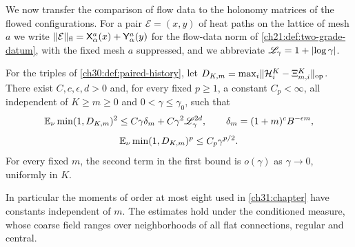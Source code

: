 We now transfer the comparison of flow data to the holonomy matrices of the flowed configurations. For a pair $\mathcal E=(x,y)$ of heat paths on the lattice of mesh $a$ we write $\lVert \mathcal E\rVert_{\mathrm{fl}}=\mathsf X_\alpha^a(x)+\mathsf Y_\alpha^a(y)$ for the flow-data norm of \cref{ch21:def:two-grade-datum}, with the fixed mesh $a$ suppressed, and we abbreviate $\mathscr L_\gamma=1+\lvert \log\gamma\rvert$.

\begin{theorem}\label{ch30:thm:scaled-matrix-tail}
For the triples of \cref{ch30:def:paired-history}, let $D_{K,m}=\max_i\lVert \mathcal H_i^K-\Xi_{m,i}^K\rVert_{\mathrm{op}}$. There exist $C,c,\epsilon,d>0$ and, for every fixed $p\ge1$, a constant $C_p<\infty$, all independent of $K\ge m\ge0$ and $0<\gamma\le\gamma_0$, such that
\[
 \mathbb E_\nu\min(1,D_{K,m})^2\le C\gamma\delta_m+C\gamma^2\mathscr L_\gamma^{2d},\qquad\delta_m=(1+m)^cB^{-\epsilon m},
\]
\[
 \mathbb E_\nu\min(1,D_{K,m})^p\le C_p\gamma^{p/2}.
\]
For every fixed $m$, the second term in the first bound is $o(\gamma)$ as $\gamma\to0$, uniformly in $K$.
\end{theorem}

In particular the moments of order at most eight used in \cref{ch31:chapter} have constants independent of $m$. The estimates hold under the conditioned measure, whose coarse field ranges over neighborhoods of all flat connections, regular and central.

